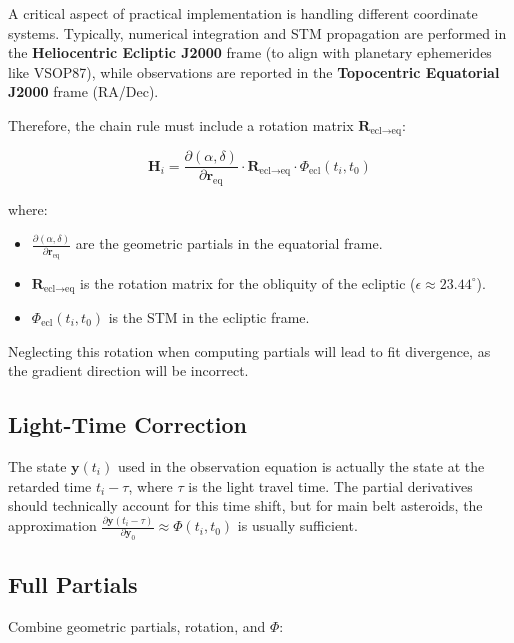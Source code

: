 A critical aspect of practical implementation is handling different coordinate systems.
Typically, numerical integration and STM propagation are performed in the \textbf{Heliocentric Ecliptic J2000} frame (to align with planetary ephemerides like VSOP87), while observations are reported in the \textbf{Topocentric Equatorial J2000} frame (RA/Dec).

Therefore, the chain rule must include a rotation matrix $\mathbf{R}_{\text{ecl}\to\text{eq}}$:

\begin{equation}
    \mathbf{H}_i = \frac{\partial (\alpha, \delta)}{\partial \mathbf{r}_{\text{eq}}} \cdot \mathbf{R}_{\text{ecl}\to\text{eq}} \cdot \Phi_{\text{ecl}}(t_i, t_0)
\end{equation}

where:
\begin{itemize}
    \item $\frac{\partial (\alpha, \delta)}{\partial \mathbf{r}_{\text{eq}}}$ are the geometric partials in the equatorial frame.
    \item $\mathbf{R}_{\text{ecl}\to\text{eq}}$ is the rotation matrix for the obliquity of the ecliptic ($\epsilon \approx 23.44^\circ$).
    \item $\Phi_{\text{ecl}}(t_i, t_0)$ is the STM in the ecliptic frame.
\end{itemize}

Neglecting this rotation when computing partials will lead to fit divergence, as the gradient direction will be incorrect.

\subsection{Light-Time Correction}

The state $\mathbf{y}(t_i)$ used in the observation equation is actually the state at the retarded time $t_i - \tau$, where $\tau$ is the light travel time. The partial derivatives should technically account for this time shift, but for main belt asteroids, the approximation $\frac{\partial \mathbf{y}(t_i-\tau)}{\partial \mathbf{y}_0} \approx \Phi(t_i, t_0)$ is usually sufficient.

\subsection{Full Partials}

Combine geometric partials, rotation, and $\Phi$:

